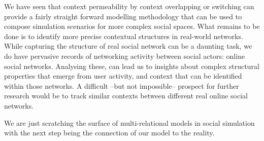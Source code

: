 \documentclass[preprint,number]{elsarticle}
\begin{document}
We have seen that context permeability by context overlapping or switching can provide a fairly straight forward modelling methodology that can be used to compose simulation scenarios for more complex social spaces. What remains to be done is to identify more precise contextual structures in real-world networks. While capturing the structure of real social network can be a daunting task, we do have pervasive records of networking activity between social actors: online social networks. Analysing these, can lead us to insights about complex structural properties that emerge from user activity, and context that can be identified within those networks. A difficult --but not impossible-- prospect for further research would be to track similar contexts between different real online social networks.

We are just scratching the surface of multi-relational models in social simulation with the next step being the connection of our model to the reality. 


\newpage
\begin{appendices}
	
\end{appendices}




\end{document}
